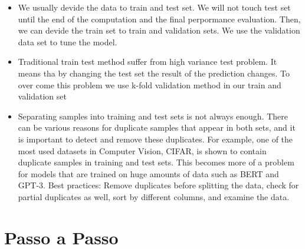 \begin{itemize}
\item We usually devide the data to train and test set. We will not touch test set until the end of the computation and the final perpormance evaluation. Then, we can devide the train set to train and validation sets. We use the validation data set to tune the model.
\item Traditional train test method suffer from high variance test problem. It means tha by changing the test set the result of the prediction changes. To over come this problem we use k-fold validation method in our train and validation set

\item Separating samples into training and test sets is not always enough. There can be various reasons for duplicate samples that appear in both sets, and it is important to detect and remove these duplicates. For example, one of the most used datasets in Computer Vision, CIFAR, is shown to contain duplicate samples in training and test sets. This becomes more of a problem for models that are trained on huge amounts of data such as BERT and GPT-3. Best practices: Remove duplicates before splitting the data, check for partial duplicates as well, sort by different columns, and examine the data.

\end{itemize}    


\section{Passo a Passo}

